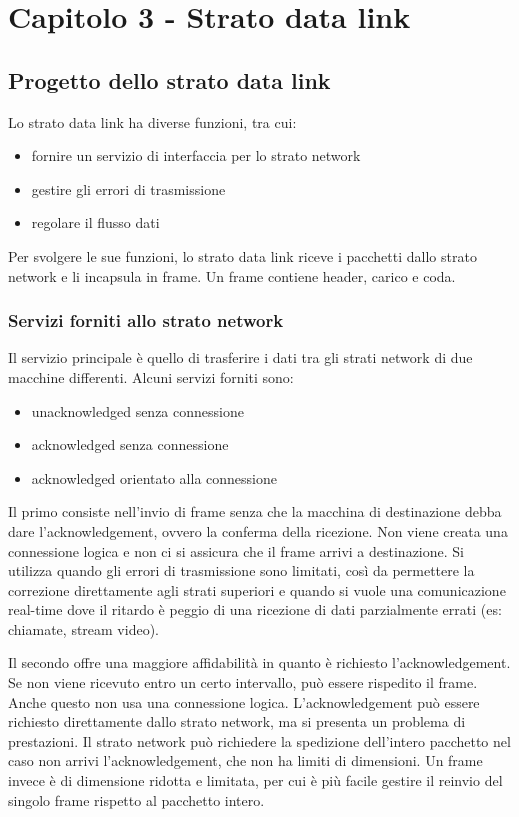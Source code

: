 \newpage
\section{Capitolo 3 - Strato data link}

\subsection{Progetto dello strato data link} %
Lo strato data link ha diverse funzioni, tra cui:
\begin{itemize}
    \item fornire un servizio di interfaccia per lo strato network
    \item gestire gli errori di trasmissione
    \item regolare il flusso dati 
\end{itemize}
Per svolgere le sue funzioni, lo strato data link riceve i pacchetti dallo strato network e li incapsula in frame.
Un frame contiene header, carico e coda.

\subsubsection{Servizi forniti allo strato network}
Il servizio principale è quello di trasferire i dati tra gli strati network di due macchine differenti.
Alcuni servizi forniti sono:
\begin{itemize}
    \item unacknowledged senza connessione
    \item acknowledged senza connessione
    \item acknowledged orientato alla connessione
\end{itemize}
Il primo consiste nell'invio di frame senza che la macchina di destinazione debba dare l'acknowledgement, ovvero la conferma della ricezione.
Non viene creata una connessione logica e non ci si assicura che il frame arrivi a destinazione.
Si utilizza quando gli errori di trasmissione sono limitati, così da permettere la correzione direttamente agli strati superiori e
quando si vuole una comunicazione real-time dove il ritardo è peggio di una ricezione di dati parzialmente errati (es: chiamate, stream video).

Il secondo offre una maggiore affidabilità in quanto è richiesto l'acknowledgement.
Se non viene ricevuto entro un certo intervallo, può essere rispedito il frame. 
Anche questo non usa una connessione logica. 
L'acknowledgement può essere richiesto direttamente dallo strato network, ma si presenta un problema di prestazioni.
Il strato network può richiedere la spedizione dell'intero pacchetto nel caso non arrivi l'acknowledgement, che non ha limiti di dimensioni.
Un frame invece è di dimensione ridotta e limitata, per cui è più facile gestire il reinvio del singolo frame rispetto al pacchetto intero.

